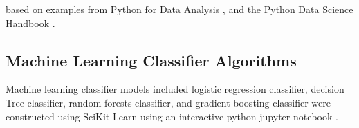 \documentclass[sigconf]{acmart}
\begin{document}
based on examples from Python for Data Analysis \cite{mckinney17}, and the 
Python Data Science Handbook \cite{vanderplas17}.  


\subsection{Machine Learning Classifier Algorithms}
Machine learning classifier models included logistic regression classifier, 
decision Tree classifier, random forests classifier, and gradient boosting 
classifier were constructed using SciKit Learn \cite{muller17, raschka17} 
using an interactive python jupyter notebook \cite{classifyH}. 





%
\end{document}
